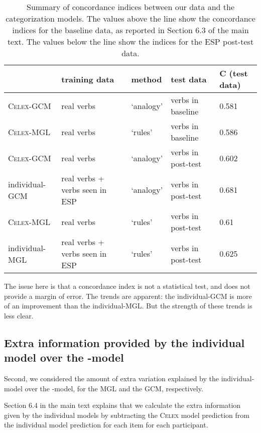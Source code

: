 \documentclass[12pt]{article}
\begin{document}
\begin{table}[h]

    \centering
    \begin{tabular}{lllll}
            & training data & method & test data & C (test data)\\
            \hline
\textsc{Celex}-GCM & real verbs & `analogy' & verbs in baseline &0.581\\
\textsc{Celex}-MGL & real verbs & `rules' & verbs in baseline &0.586\\ \hline
\textsc{Celex}-GCM & real verbs & `analogy' & verbs in post-test &0.602\\
individual-GCM & real verbs + verbs seen in ESP & `analogy' & verbs in post-test &0.681\\

\textsc{Celex}-MGL & real verbs & `rules' & verbs in post-test &0.61\\
individual-MGL & real verbs + verbs seen in ESP & `rules' & verbs in post-test &0.625\\
\hline
    \end{tabular}
    \caption{Summary of concordance indices between our data and the categorization models. The values above the line show the concordance indices for the baseline data, as reported in Section 6.3 of the main text. The values below the line show the indices for the ESP post-test data.}
    \label{modellingsummary}

\end{table}

The issue here is that a concordance index is not a statistical test, and does not provide a margin of error. The trends are apparent: the individual-GCM is more of an improvement than the individual-MGL. But the strength of these trends is less clear.

\subsection{Extra information provided by the individual model over the -model}

Second, we considered the amount of extra variation explained by the individual-model over the -model, for the MGL and the GCM, respectively.

Section 6.4 in the main text explains that we calculate the extra information given by the individual models by subtracting the \textsc{Celex} model prediction from the individual model prediction for each item for each participant.
\end{document}
